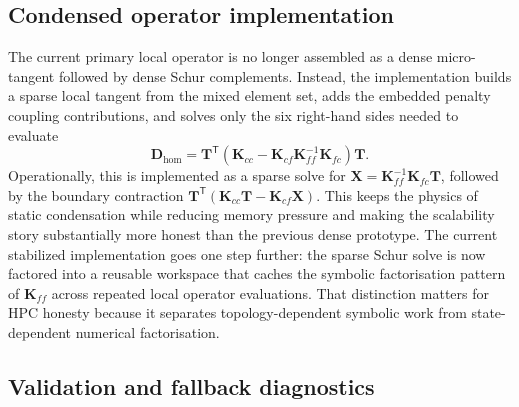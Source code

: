 \subsection{Condensed operator implementation}

The current primary local operator is no longer assembled as a dense
micro-tangent followed by dense Schur complements.  Instead, the implementation
builds a sparse local tangent from the mixed element set, adds the embedded
penalty coupling contributions, and solves only the six right-hand sides needed
to evaluate
\begin{equation}
  \mathbf{D}_{\mathrm{hom}}
  =
  \mathbf{T}^{\mathsf T}
  \left(
    \mathbf{K}_{cc}
    -
    \mathbf{K}_{cf}\mathbf{K}_{ff}^{-1}\mathbf{K}_{fc}
  \right)\mathbf{T}.
\end{equation}
Operationally, this is implemented as a sparse solve for
\(\mathbf{X} = \mathbf{K}_{ff}^{-1}\mathbf{K}_{fc}\mathbf{T}\), followed by
the boundary contraction
\(\mathbf{T}^{\mathsf T}(\mathbf{K}_{cc}\mathbf{T}-\mathbf{K}_{cf}\mathbf{X})\).
This keeps the physics of static condensation while reducing memory pressure
and making the scalability story substantially more honest than the previous
dense prototype.  The current stabilized implementation goes one step further:
the sparse Schur solve is now factored into a reusable workspace that caches
the symbolic factorisation pattern of \(\mathbf{K}_{ff}\) across repeated local
operator evaluations.  That distinction matters for HPC honesty because it
separates topology-dependent symbolic work from state-dependent numerical
factorisation.

\subsection{Validation and fallback diagnostics}

